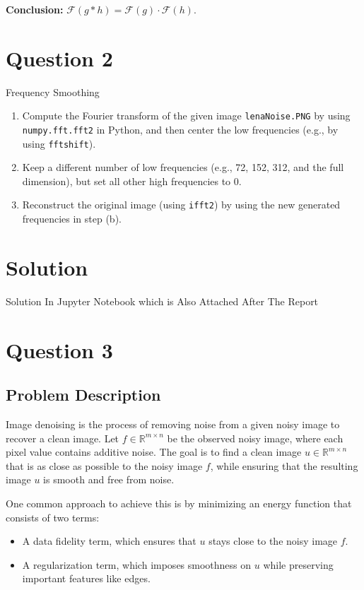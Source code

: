 \documentclass[a4paper,12pt]{article}
\begin{document}
\textbf{Conclusion:} \( \mathcal{F}(g \ast h) = \mathcal{F}(g) \cdot \mathcal{F}(h) \).

\section{Question 2}

Frequency Smoothing

\begin{enumerate}
    \item[(a)] Compute the Fourier transform of the given image \texttt{lenaNoise.PNG} by using \texttt{numpy.fft.fft2} in Python, and then center the low frequencies (e.g., by using \texttt{fftshift}).
    
    \item[(b)] Keep a different number of low frequencies (e.g., 72, 152, 312, and the full dimension), but set all other high frequencies to 0.
    
    \item[(c)] Reconstruct the original image (using \texttt{ifft2}) by using the new generated frequencies in step (b).
\end{enumerate}

\section*{Solution}
Solution In Jupyter Notebook which is Also Attached After The Report

\section{Question 3}

\subsection{Problem Description}

Image denoising is the process of removing noise from a given noisy image to recover a clean image. Let \( f \in \mathbb{R}^{m \times n} \) be the observed noisy image, where each pixel value contains additive noise. The goal is to find a clean image \( u \in \mathbb{R}^{m \times n} \) that is as close as possible to the noisy image \( f \), while ensuring that the resulting image \( u \) is smooth and free from noise.

One common approach to achieve this is by minimizing an energy function that consists of two terms:
\begin{itemize}
    \item A data fidelity term, which ensures that \( u \) stays close to the noisy image \( f \).
    \item A regularization term, which imposes smoothness on \( u \) while preserving important features like edges.
\end{itemize}
\end{document}
